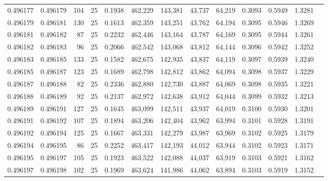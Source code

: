 \begin{tabular}{rrrrrrrrrrrrr}
0.496177 & 0.496179 &   104 &  25 &                                     0.1938 & 462,229 & 143,381 &  43,737 &  64,219 & 0.3093 & 0.5949 & 1.3281 \\
0.496179 & 0.496181 &   130 &  25 &                                     0.1613 & 462,359 & 143,251 &  43,762 &  64,194 & 0.3095 & 0.5946 & 1.3269 \\
0.496181 & 0.496182 &    87 &  25 &                                     0.2232 & 462,446 & 143,164 &  43,787 &  64,169 & 0.3095 & 0.5944 & 1.3261 \\
0.496182 & 0.496183 &    96 &  25 &                                     0.2066 & 462,542 & 143,068 &  43,812 &  64,144 & 0.3096 & 0.5942 & 1.3252 \\
0.496183 & 0.496185 &   133 &  25 &                                     0.1582 & 462,675 & 142,935 &  43,837 &  64,119 & 0.3097 & 0.5939 & 1.3240 \\
0.496185 & 0.496187 &   123 &  25 &                                     0.1689 & 462,798 & 142,812 &  43,862 &  64,094 & 0.3098 & 0.5937 & 1.3229 \\
0.496187 & 0.496188 &    82 &  25 &                                     0.2336 & 462,880 & 142,730 &  43,887 &  64,069 & 0.3098 & 0.5935 & 1.3221 \\
0.496188 & 0.496189 &    92 &  25 &                                     0.2137 & 462,972 & 142,638 &  43,912 &  64,044 & 0.3099 & 0.5932 & 1.3213 \\
0.496189 & 0.496191 &   127 &  25 &                                     0.1645 & 463,099 & 142,511 &  43,937 &  64,019 & 0.3100 & 0.5930 & 1.3201 \\
0.496191 & 0.496192 &   107 &  25 &                                     0.1894 & 463,206 & 142,404 &  43,962 &  63,994 & 0.3101 & 0.5928 & 1.3191 \\
0.496192 & 0.496194 &   125 &  25 &                                     0.1667 & 463,331 & 142,279 &  43,987 &  63,969 & 0.3102 & 0.5925 & 1.3179 \\
0.496194 & 0.496195 &    86 &  25 &                                     0.2252 & 463,417 & 142,193 &  44,012 &  63,944 & 0.3102 & 0.5923 & 1.3171 \\
0.496195 & 0.496197 &   105 &  25 &                                     0.1923 & 463,522 & 142,088 &  44,037 &  63,919 & 0.3103 & 0.5921 & 1.3162 \\
0.496197 & 0.496198 &   102 &  25 &                                     0.1969 & 463,624 & 141,986 &  44,062 &  63,894 & 0.3103 & 0.5919 & 1.3152 \\

\end{tabular}
